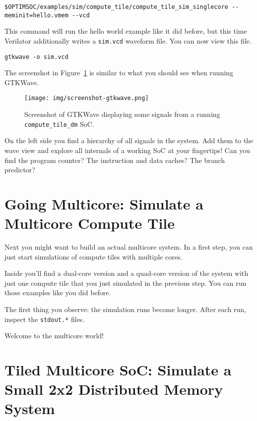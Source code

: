 \begin{lstlisting}
$OPTIMSOC/examples/sim/compute_tile/compute_tile_sim_singlecore --meminit=hello.vmem --vcd
\end{lstlisting}

This command will run the hello world example like it did before, but this time Verilator additionally writes a \verb|sim.vcd| waveform file.
You can now view this file.
\begin{lstlisting}
gtkwave -o sim.vcd
\end{lstlisting}
The screenshot in Figure~\ref{fig:tutorials:screenshot-gtkwave-compute_tile} is similar to what you should see when running GTKWave.

\begin{figure}
 \centering
 \texttt{[image: img/screenshot-gtkwave.png]}
 \caption{Screenshot of GTKWave displaying some signals from a running \texttt{compute\_tile\_dm} SoC.}
 \label{fig:tutorials:screenshot-gtkwave-compute_tile}
\end{figure}

On the left side you find a hierarchy of all signals in the system.
Add them to the wave view and explore all internals of a working SoC at your fingertips!
Can you find the program counter? The instruction and data caches? The branch predictor?


\section{Going Multicore: Simulate a Multicore Compute Tile}

Next you might want to build an actual multicore system. In a first
step, you can just start simulations of compute tiles with multiple
cores.

Inside  you'll find a dual-core version and a quad-core version of the system with just one compute tile that you just simulated in the previous step.
You can run those examples like you did before.

The first thing you observe: the simulation runs become longer.
After each run, inspect the \verb|stdout.*| files.

Welcome to the multicore world!

\section{Tiled Multicore SoC: Simulate a Small 2x2 Distributed Memory
  System}

